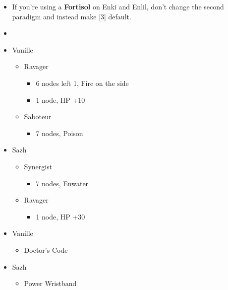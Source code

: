 \begin{menu}
		\begin{itemize}
			\paradigm
			\begin{itemize}
				\item If you're using a \textbf{Fortisol} on Enki and Enlil, don't change the second paradigm and instead make [3] default.
				\item {}%
				      {\paradigmline{\rav}{\com}{}}%
				      {\paradigmline[2]{\textit{(\sab)}}{\textit{(\syn)}}{}}%
				      {\paradigmline{\sab}{\syn}{}}%
				      {\paradigmline{\rav}{\rav}{}}%
				      {\paradigmline{[\sab]}{(\rav)}{}}%
				      {\paradigmline{[\sab]}{\com}{}}
			\end{itemize}
			\crystarium
			\begin{itemize}
				\item Vanille
				      \begin{itemize}
					      \item Ravager
					            \begin{itemize}
						            \item 6 nodes left 1, Fire on the side
						            \item 1 node, HP +10
					            \end{itemize}
					      \item Saboteur
					            \begin{itemize}
						            \item 7 nodes, Poison
					            \end{itemize}
				      \end{itemize}
				\item Sazh
				      \begin{itemize}
					      \item Synergist
					            \begin{itemize}
						            \item 7 nodes, Enwater
					            \end{itemize}
					      \item Ravager
					            \begin{itemize}
						            \item 1 node, HP +30
					            \end{itemize}
				      \end{itemize}
			\end{itemize}
			\equip
			\begin{itemize}
				\item Vanille
				      \begin{itemize}
					      \item Doctor's Code
				      \end{itemize}
				\item Sazh
				      \begin{itemize}
					      \item Power Wristband
				      \end{itemize}
			\end{itemize}
		\end{itemize}
\end{menu}
